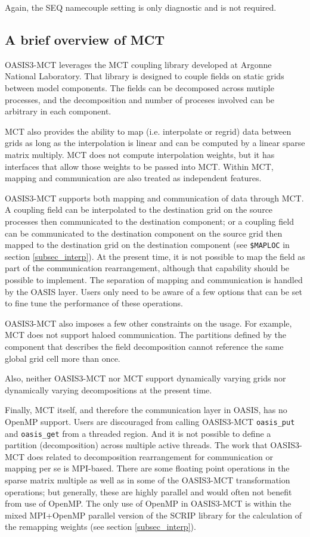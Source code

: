 Again, the SEQ namecouple setting is only diagnostic and is not
required.

\subsection{A brief overview of MCT}
\label{subsec_MCT}

OASIS3-MCT leverages the MCT coupling library
developed at Argonne National Laboratory.  That library is designed
to couple fields on static grids between model components.  The fields
can be decomposed across mutiple processes, and the decomposition
and number of proceses involved can be arbitrary in each component.  

MCT also provides the ability to map (i.e. interpolate or
regrid) data between grids as long as the interpolation is linear and can
be computed by a linear sparse matrix multiply.
MCT does not compute interpolation weights, but
it has interfaces that allow those weights to be passed into MCT.  Within
MCT, mapping and communication are also treated as independent features.

OASIS3-MCT supports both mapping and communication of data through MCT.  
A coupling field can be interpolated to
the destination grid on the source processes then communicated to the destination
component; or a coupling field can be communicated to the destination component
on the source grid then mapped to the destination grid on the destination
component (see {\tt \$MAPLOC}  in section \ref{subsec_interp}). At the present time, it is not possible to map the field as part
of the communication rearrangement, although that capability should
be possible to implement.
The separation of mapping and communication is handled by the OASIS
layer.  Users only need to be aware of a few options that can be set to fine
tune the performance of these operations.

OASIS3-MCT also imposes a few other constraints on the usage.  For example, MCT
does not support haloed communication.  The partitions defined by the component that describes
the field decomposition cannot reference the same global grid cell more than once.

Also, neither OASIS3-MCT nor MCT support dynamically varying grids nor dynamically varying
decompositions at the present time.  

Finally, MCT itself, and therefore the communication layer in OASIS, has no OpenMP support. Users are discouraged from calling OASIS3-MCT {\tt oasis\_put} and {\tt oasis\_get}
from a threaded region.  And it is not possible to define a partition (decomposition) across multiple active threads. 
 The work that OASIS3-MCT does related to decomposition rearrangement for communication or mapping per se is MPI-based.  There
are some floating point operations in the sparse matrix multiple as well as in
some of the OASIS3-MCT transformation operations; but generally, these are highly parallel and
would often not benefit from use of OpenMP.  The only use of OpenMP in  OASIS3-MCT is within the mixed MPI+OpenMP parallel version of the SCRIP library for the calculation of the remapping weights (see section \ref{subsec_interp}). 


